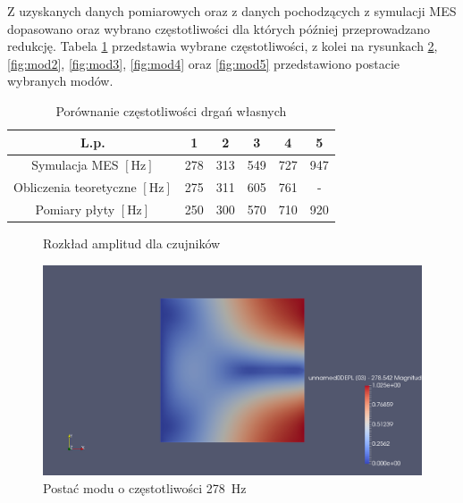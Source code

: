 \documentclass[polish,a4paper,11pt]{mwart}
\begin{document}
Z uzyskanych danych pomiarowych oraz z danych pochodzących z symulacji MES
dopasowano oraz wybrano częstotliwości dla których później przeprowadzano
redukcję. Tabela \ref{tab:identyfikacja} przedstawia wybrane częstotliwości, z
kolei na rysunkach \ref{fig:mod1}, \ref{fig:mod2}, \ref{fig:mod3},
\ref{fig:mod4} oraz
\ref{fig:mod5} przedstawiono postacie wybranych modów.

\begin{table}[!tbh]
  \centering
  \caption{Porównanie częstotliwości drgań własnych}
  \begin{tabular}{|c|c|c|c|c|c|} \hline
    L.p. & 1 & 2 & 3 & 4 & 5 \\ \hline
    Symulacja MES $[\si{\hertz}]$ & 278 & 313 & 549 & 727 & 947 \\ \hline
    Obliczenia teoretyczne $[\si{\hertz}]$ & 275 & 311 & 605 & 761 & - \\ \hline
    Pomiary płyty $[\si{\hertz}]$ & 250 & 300 & 570 & 710 & 920 \\ \hline
  \end{tabular}
  \label{tab:identyfikacja}
\end{table}

\begin{figure}[!tbh]
  
  \caption{Rozkład amplitud dla czujników}
  \label{fig:mody}
\end{figure}

\begin{figure}[!tbh]
  \centering
  \includegraphics[width=\textwidth]{./plate_vib/278Hz.png}
  \caption{Postać modu o częstotliwości \SI{278}{\hertz}}
  \label{fig:mod1}
\end{figure}
\end{document}
